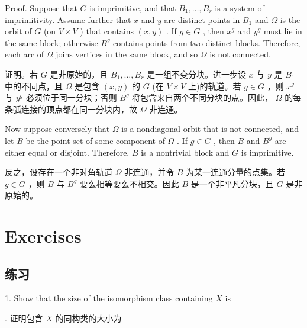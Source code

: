 \documentclass[10pt]{article}
\begin{document}
Proof. Suppose that \(G\) is imprimitive, and that \({B}_{1},\ldots ,{B}_{r}\) is a system of imprimitivity. Assume further that \(x\) and \(y\) are distinct points in \({B}_{1}\) and \(\Omega\) is the orbit of \(G\) (on \(V \times  V\) ) that contains \(\left( {x,y}\right)\) . If \(g \in  G\) , then \({x}^{g}\) and \({y}^{g}\) must lie in the same block; otherwise \({B}^{g}\) contains points from two distinct blocks. Therefore, each arc of \(\Omega\) joins vertices in the same block, and so \(\Omega\) is not connected.

\begin{tcolorbox}\relax
证明。若 \(G\) 是非原始的，且 \({B}_{1},\ldots ,{B}_{r}\) 是一组不变分块。进一步设 \(x\) 与 \(y\) 是 \({B}_{1}\) 中的不同点，且 \(\Omega\) 是包含 \(\left( {x,y}\right)\) 的 \(G\) (在 \(V \times  V\) 上)的轨道。若 \(g \in  G\) ，则 \({x}^{g}\) 与 \({y}^{g}\) 必须位于同一分块；否则 \({B}^{g}\) 将包含来自两个不同分块的点。因此， \(\Omega\) 的每条弧连接的顶点都在同一分块内，故 \(\Omega\) 非连通。
\end{tcolorbox}

Now suppose conversely that \(\Omega\) is a nondiagonal orbit that is not connected, and let \(B\) be the point set of some component of \(\Omega\) . If \(g \in  G\) , then \(B\) and \({B}^{g}\) are either equal or disjoint. Therefore, \(B\) is a nontrivial block and \(G\) is imprimitive.

\begin{tcolorbox}\relax
反之，设存在一个非对角轨道 \(\Omega\) 非连通，并令 \(B\) 为某一连通分量的点集。若 \(g \in  G\) ，则 \(B\) 与 \({B}^{g}\) 要么相等要么不相交。因此 \(B\) 是一个非平凡分块，且 \(G\) 是非原始的。
\end{tcolorbox}

\section*{Exercises}

\begin{tcolorbox}\relax
\section*{练习}
\end{tcolorbox}

1. Show that the size of the isomorphism class containing \(X\) is

\begin{tcolorbox}. 证明包含 \(X\) 的同构类的大小为
\end{tcolorbox}
\end{document}
